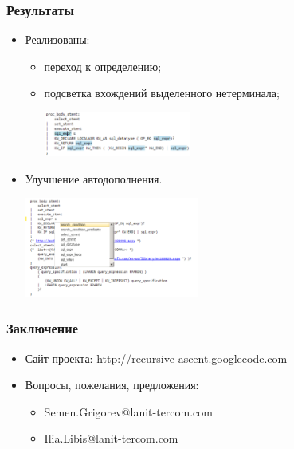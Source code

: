 \documentclass{beamer}
\begin{document}
\begin{frame}
	\transwipe[direction=90]
	\frametitle{Результаты}
	\begin{itemize}
        \item Реализованы:
	    \begin{itemize}
            \item переход к определению;
            \item подсветка вхождений выделенного нетерминала;
            
                
            	\begin{center}
                    {\includegraphics[width=0.4\textwidth, height=0.2\textheight]{diagrams/Select.pdf}}
                \end{center}
            
        \end{itemize}
        \item 
        {
            Улучшение автодополнения.
           	\begin{center}
                    {\includegraphics[width= 0.45\textwidth, height=0.35\textheight]{diagrams/Autocomplete.pdf}}
            \end{center}
        }
    \end{itemize}
\end{frame}
    
\author[Григорьев Семён]{}

\begin{frame}
	\transwipe[direction=90]
	\frametitle{Заключение}
	\begin{itemize}
        \item Сайт проекта: \href{http://recursive-ascent.googlecode.com} {http://recursive-ascent.googlecode.com}
	    \item Вопросы, пожелания, предложения:
	        \begin{itemize}
	            \item Semen.Grigorev@lanit-tercom.com
	            \item Ilia.Libis@lanit-tercom.com
            \end{itemize} 
    \end{itemize}
\end{frame}
\end{document}
